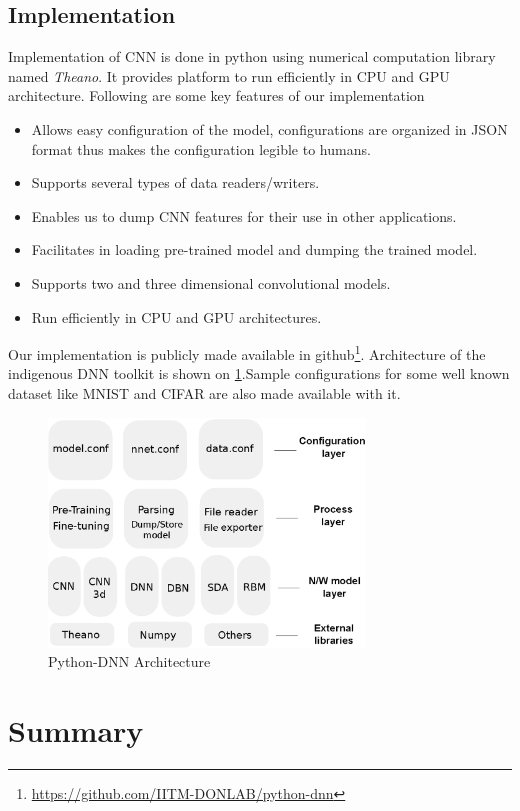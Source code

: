 \subsection{Implementation}
Implementation of CNN is done in python using numerical computation library named \textit{Theano}. It provides platform to run efficiently in CPU and GPU architecture. Following are some key features of our implementation
\begin{itemize}
	\item  Allows easy configuration of the model, configurations are organized in JSON format thus makes the configuration legible to humans.
	\item Supports several types of data readers/writers.
	\item Enables us to dump CNN features for their use in other applications.
	\item Facilitates in loading pre-trained model and dumping the trained model.
	\item Supports two and three dimensional convolutional models.
	\item Run efficiently in CPU and GPU architectures.
	
\end{itemize}
Our implementation is publicly made available in github\footnote{\url{https://github.com/IITM-DONLAB/python-dnn}}. Architecture of the indigenous DNN toolkit is shown on \ref{fig:architecture}.Sample configurations for some well known dataset like MNIST and CIFAR are also made available with it.
\begin{figure}[htpb]
   \begin{center}
	    \includegraphics[width=0.75\textwidth]{snaps/architecture.eps}     
     \caption {Python-DNN Architecture}
	 \label{fig:architecture}
   \end{center}
 \end{figure}
\section{Summary}